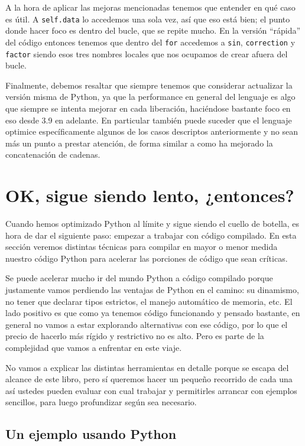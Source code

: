A la hora de aplicar las mejoras mencionadas tenemos que entender en qué caso es útil. A \texttt{self.data} lo accedemos una sola vez, así que eso está bien; el punto donde hacer foco es dentro del bucle, que se repite mucho. En la versión ``rápida'' del código entonces tenemos que dentro del \texttt{for} accedemos a \texttt{sin}, \texttt{correction} y \texttt{factor} siendo esos tres nombres locales que nos ocupamos de crear afuera del bucle.

Finalmente, debemos resaltar que siempre tenemos que considerar actualizar la versión misma de Python, ya que la performance en general del lenguaje es algo que siempre se intenta mejorar en cada liberación, haciéndose bastante foco en eso desde 3.9 en adelante. En particular también puede suceder que el lenguaje optimice específicamente algunos de los casos descriptos anteriormente y no sean más un punto a prestar atención, de forma similar a como ha mejorado la concatenación de cadenas.


\section{OK, sigue siendo lento, ¿entonces?}

Cuando hemos optimizado Python al límite y sigue siendo el cuello de botella, es hora de dar el siguiente paso: empezar a trabajar con código compilado. En esta sección veremos distintas técnicas para compilar en mayor o menor medida nuestro código Python para acelerar las porciones de código que sean críticas.

Se puede acelerar mucho ir del mundo Python a código compilado porque justamente vamos perdiendo las ventajas de Python en el camino: su dinamismo, no tener que declarar tipos estrictos, el manejo automático de memoria, etc. El lado positivo es que como ya tenemos código funcionando y pensado bastante, en general no vamos a estar explorando alternativas con ese código, por lo que el precio de hacerlo más rígido y restrictivo no es alto. Pero es parte de la complejidad que vamos a enfrentar en este viaje.

No vamos a explicar las distintas herramientas en detalle porque se escapa del alcance de este libro, pero sí queremos hacer un pequeño recorrido de cada una así ustedes pueden evaluar con cual trabajar y permitirles arrancar con ejemplos sencillos, para luego profundizar según sea necesario.


\subsection{Un ejemplo usando Python}

